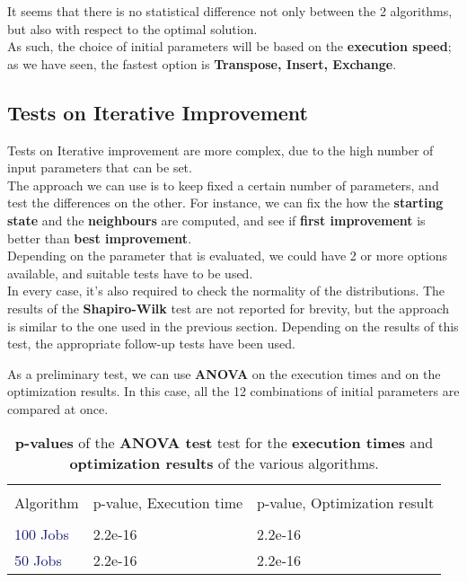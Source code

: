 \documentclass[
12pt,
a4paper,
oneside,
headinclude,
footinclude]{article}
\theoremstyle{definition} %
\begin{document}
It seems that there is no statistical difference not only between the 2 algorithms, but also with respect to the optimal solution.\\
As such, the choice of initial parameters will be based on the \textbf{execution speed}; as we have seen, the fastest option is \textbf{Transpose, Insert, Exchange}.

\subsection{Tests on Iterative Improvement}

Tests on Iterative improvement are more complex, due to the high number of input parameters that can be set.\\
The approach we can use is to keep fixed a certain number of parameters, and test the differences on the other. For instance, we can fix the how the \textbf{starting state} and the \textbf{neighbours} are computed, and see if \textbf{first improvement} is better than \textbf{best improvement}.\\
Depending on the parameter that is evaluated, we could have 2 or more options available, and suitable tests have to be used.\\
In every case, it's also required to check the normality of the distributions. The results of the \textbf{Shapiro-Wilk} test are not reported for brevity, but the approach is similar to the one used in the previous section. Depending on the results of this test, the appropriate follow-up tests have been used.

As a preliminary test, we can use \textbf{ANOVA} on the execution times and on the optimization results. In this case, all the 12 combinations of initial parameters are compared at once.

\begin{table}[H]
    \centering %
    \begin{tabular}{l l l} %
        \hline
        \hline 
        \\[-1.5ex]
        \textcolor{BrickRed}{Algorithm} & \textcolor{BrickRed}{p-value, Execution time} & \textcolor{BrickRed}{p-value, Optimization result}\\ [0.5ex]
        \hline %
        \\[-1.5ex]
        \textcolor{MidnightBlue}{100 Jobs}  & 2.2e-16 & 2.2e-16\\
        \textcolor{MidnightBlue}{50 Jobs}   & 2.2e-16  & 2.2e-16   
        \\[1ex] %
        \hline %
    \end{tabular}
    \caption{\label{tab:ii-anova}\textbf{p-values} of the \textbf{ANOVA test} test for the \textbf{execution times} and \textbf{optimization results} of the various algorithms.}
\end{table} 
\end{document}
